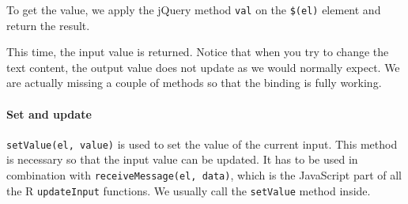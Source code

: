 \documentclass[]{book}
\newenvironment{Shaded}{\begin{snugshade}}{\end{snugshade}}
\newcommand{\ControlFlowTok}[1]{\textcolor[rgb]{0.13,0.29,0.53}{\textbf{#1}}}
\newcommand{\KeywordTok}[1]{\textcolor[rgb]{0.13,0.29,0.53}{\textbf{#1}}}
\newcommand{\NormalTok}[1]{#1}
\newcommand{\OperatorTok}[1]{\textcolor[rgb]{0.81,0.36,0.00}{\textbf{#1}}}
\newcommand{\StringTok}[1]{\textcolor[rgb]{0.31,0.60,0.02}{#1}}
\let\oldparagraph\paragraph
\renewcommand{\paragraph}[1]{\oldparagraph{#1}\mbox{}}
\begin{document}
To get the value, we apply the jQuery method \texttt{val} on the \texttt{\$(el)} element and return the result.

\begin{Shaded}
\end{Shaded}

This time, the input value is returned. Notice that when you try to change the text content, the output value does not update as we would normally expect. We are actually missing a couple of methods so that the binding is fully working.

\hypertarget{set-and-update}{%
\paragraph{Set and update}\label{set-and-update}}

\texttt{setValue(el,\ value)} is used to set the value of the current input. This method is necessary so that the input value can be updated. It has to be used in combination with \texttt{receiveMessage(el,\ data)}, which is the JavaScript part of all the R \texttt{updateInput} functions. We usually call the \texttt{setValue} method inside.
\end{document}
